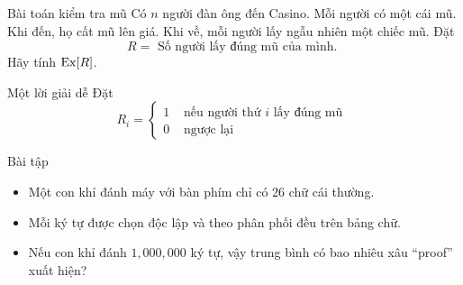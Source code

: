 \begin{frame}
	\begin{block}{Bài toán kiểm tra mũ}
		Có $n$ người đàn ông đến Casino. Mỗi người có một cái mũ. Khi đến, họ cất mũ lên giá.  Khi về, mỗi người lấy ngẫu nhiên một chiếc mũ. Đặt 
		\[
			R = \text{ Số người lấy đúng mũ của mình. }
		\] 
		Hãy tính $\mathrm{Ex}[R]$.
	\end{block}
\end{frame}
\begin{frame}
	\begin{block}{Một lời giải dễ}
	Đặt 
	\[
		R_i = \begin{cases}
			1 & \text{ nếu người thứ $i$ lấy đúng mũ } \\
			0 & \text{ ngược lại }
		\end{cases}
	\]
	\action<2->{Ta có 
	\[
		R = R_1 + R_2 + \cdots + R_n. 
	\]}
	\end{block}
\end{frame}

\begin{frame}{Bài tập}
  \begin{itemize}
  \item Một con khỉ đánh máy với  bàn phím chỉ có $26$ chữ cái thường.
  \item Mỗi ký tự được chọn độc lập và theo phân phối đều trên bảng chữ.
  \item Nếu con khỉ đánh $1,000,000$ ký tự, vậy trung bình có bao nhiêu xâu ``proof'' xuất hiện?
  \end{itemize}
\end{frame}




